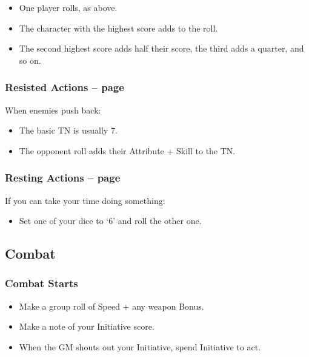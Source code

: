 \begin{multicols}{2}
\begin{itemize}
  \item{One player rolls, as above.}
  \item{The character with the highest score adds to the roll.}
  \item{The second highest score adds half their score, the third adds a quarter, and so on.}

\end{itemize}

\subsubsection{Resisted Actions -- page \pageref{resistedactions}}

When enemies push back:

\begin{itemize}

  \item{The basic TN is usually 7.}
  \item{The opponent roll adds their Attribute + Skill to the TN.}

\end{itemize}

\subsubsection{Resting Actions -- page \pageref{restingactions}}

If you can take your time doing something:

\begin{itemize}

  \item{Set one of your dice to `6' and roll the other one.}
  
\end{itemize}

\subsection{Combat}

\subsubsection{Combat Starts}

\begin{itemize}

  \item{Make a group roll of Speed + any weapon Bonus.}
  \item{Make a note of your Initiative score.}
  \item{When the GM shouts out your Initiative, spend Initiative to act.}


\end{itemize}
\end{multicols}
